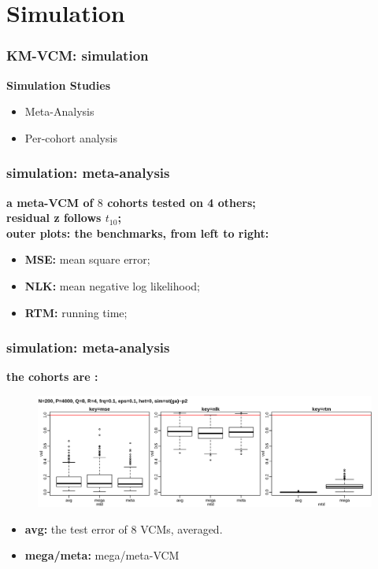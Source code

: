 \documentclass{beamer}
\begin{document}
\section{Simulation}
\begin{frame}
  \frametitle{KM-VCM: simulation} %
  \centering
  \Large{\textbf{Simulation Studies}}
  \normalsize
  \begin{itemize}
  \item Meta-Analysis
  \item Per-cohort analysis
  \end{itemize}
\end{frame}
\begin{frame}\frametitle{simulation: meta-analysis}
  \textbf{a meta-VCM of $8$ cohorts tested on 4 others;} \\
  \textbf{residual z follows $t_{10}$;} \\
  {\color{blue}\textbf{outer plots: the benchmarks, from left to right:}}
  \begin{itemize}
  \item \textbf{MSE:} mean square error;
  \item \textbf{NLK:} mean negative log likelihood;
  \item \textbf{RTM:} running time;
  \end{itemize}
\end{frame}
\begin{frame} \frametitle{simulation: meta-analysis}
  \textbf{the cohorts are \color{blue}{homogeneous}:} \\
  \begin{figure}
    \centering \includegraphics[width=.95\linewidth]{img/met_hom_stt_mnq_ssz}
  \end{figure}
  \textbf{\color{blue}{inner plot: strategies, from left to right:}}
  \begin{itemize}
  \item \textbf{avg:} the test error of 8 VCMs, averaged.
  \item \textbf{mega/meta:} mega/meta-VCM
  \end{itemize}
\end{frame}
\end{document}
